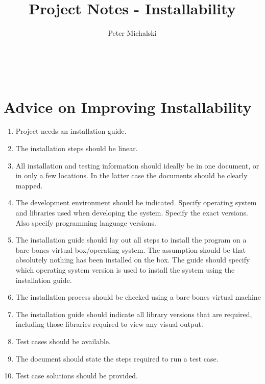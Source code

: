 \documentclass{article}
\title{Project Notes - Installability}
\author{Peter Michalski}
\date{}
\begin{document}
\maketitle

~\newpage
\section{Advice on Improving Installability}

\begin{enumerate}
	\item Project needs an installation guide.
	\item The installation steps should be linear.
	\item All installation and testing information should ideally be in one document, or in only a few locations. In the latter case the documents should be clearly mapped.
	\item The development environment should be indicated. Specify operating system and libraries used when developing the system. Specify the exact versions. Also specify programming language versions.
	\item The installation guide should lay out all steps to install the program on a bare bones virtual box/operating system. The assumption should be that absolutely nothing has been installed on the box. The guide should specify which operating system version is used to install the system using the installation guide. 
	\item The installation process should be checked using a bare bones virtual machine
	\item The installation guide should indicate all library versions that are required, including those libraries required to view any visual output.
	\item Test cases should be available.
	\item The document should state the steps required to run a test case. 
	\item Test case solutions should be provided. 
\end{enumerate}
\end{document}
